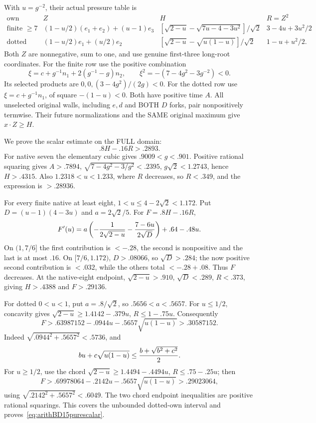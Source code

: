 \documentclass[11pt]{article}
\begin{document}
With \(u=g^{-2}\), their actual pressure table is
\[
\begin{array}{c|c|c|c}
 \text{own}&Z&H&R=Z^2\\ \hline
 \text{finite }\ge7&
 (1-u/2)(e_1+e_2)+(u-1)e_3&
 [\sqrt{2-u}-\sqrt{7u-4-3u^2}]/\sqrt2&
 3-4u+3u^2/2\\
 \text{dotted}&
 (1-u/2)e_1+(u/2)e_2&
 [\sqrt{2-u}-\sqrt{u(1-u)}]/\sqrt2&
 1-u+u^2/2 .
\end{array}
\]
Both \(Z\) are nonnegative, sum to one, and use genuine
first-three long-root coordinates.
For the finite row use the positive combination
\[
 \xi=c+g^{-1}n_1+2(g^{-1}-g)n_2,\qquad
 \xi^2=-(7-4g^2-3g^{-2})<0 .
\]
Its selected products are \(0,0,(3-4g^2)/(2g)<0\).
For the dotted row use
\(\xi=c+g^{-1}n_1\), of square \(-(1-u)<0\).
Both have positive time \(A\).
All unselected original walls, including \(e,d\) and
BOTH \(D\) forks, pair nonpositively termwise.
Their future normalizations and the SAME original
maximum give \(x\cdot Z\ge H\).

We prove the scalar estimate on the FULL domain:
\[
                         .8H-.16R>.2893 .
\tag{R1S}\label{eq:arithBD15purescalar}
\]
For native seven the elementary cubic gives
\(.9009<g<.901\).
Positive rational squaring gives \(A>.7894\),
\(\sqrt{7-4g^2-3/g^2}<.2395\), \(g\sqrt2<1.2743\),
hence \(H>.4315\).
Also \(1.2318<u<1.233\), where \(R\) decreases,
so \(R<.349\), and the expression is \(>.28936\).

For every finite native at least eight,
\(1<u\le4-2\sqrt2<1.172\).
Put \(D=(u-1)(4-3u)\) and \(a=2\sqrt2/5\).
For \(F=.8H-.16R\),
\[
 F'(u)=a\left(-{1\over2\sqrt{2-u}}
             -{7-6u\over2\sqrt D}\right)+.64-.48u .
\]
On \((1,7/6]\) the first contribution is \(<-.28\),
the second is nonpositive and the last is at most \(.16\).
On \([7/6,1.172)\), \(D>.08066\), so \(\sqrt D>.284\);
the now positive second contribution is \(<.032\),
while the others total \(<-.28+.08\).
Thus \(F\) decreases.
At the native-eight endpoint,
\(\sqrt{2-u}>.910\), \(\sqrt D<.289\), \(R<.373\),
giving \(H>.4388\) and \(F>.29136\).

For dotted \(0<u<1\), put \(a=.8/\sqrt2\),
so \(.5656<a<.5657\).
For \(u\le1/2\), concavity gives
\(\sqrt{2-u}\ge1.4142-.379u\), \(R\le1-.75u\).
Consequently
\[
 F>.63987152-.0944u-.5657\sqrt{u(1-u)}
   >.30587152 .
\]
Indeed \(\sqrt{.0944^2+.5657^2}<.5736\), and
\[
 bu+c\sqrt{u(1-u)}
 \le{b+\sqrt{b^2+c^2}\over2}.
\]
For \(u\ge1/2\), use the chord
\(\sqrt{2-u}\ge1.4494-.4494u\), \(R\le.75-.25u\);
then
\[
 F>.69978064-.2142u-.5657\sqrt{u(1-u)}
   >.29023064,
\]
using \(\sqrt{.2142^2+.5657^2}<.6049\).
The two chord endpoint inequalities are positive
rational squarings.
This covers the unbounded dotted-own interval and
proves~\eqref{eq:arithBD15purescalar}.
\end{document}
